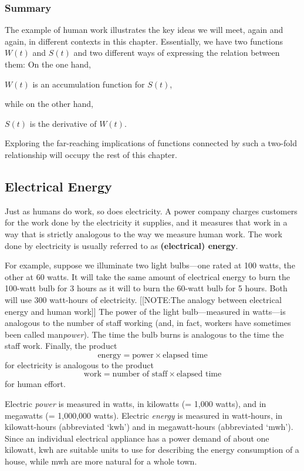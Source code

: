 \subsubsection{Summary}
\label{subsubsec:summary}

The example of human work illustrates the key ideas we will meet,
again and again, in different contexts in this chapter. Essentially,
we have two functions $W(t)$ and $S(t)$ and two different ways of
expressing the relation between them: On the one hand,
\begin{center}
$W(t)$ is an accumulation function for $S(t)$,
\end{center}
while on the other hand,
\begin{center}
$S(t)$ is the derivative of $W(t)$.
\end{center}
Exploring the far-reaching implications of functions connected by such
a two-fold relationship will occupy the rest of this chapter.





\subsection{Electrical Energy}
\label{subsec:electrical-energy}

Just as humans do work, so does electricity.  A power company charges
customers for the work done by the electricity it supplies, and it
measures that work in a way that is strictly analogous to the way we
measure human work.  The work done by electricity is usually referred
to as {\bf (electrical) energy}.

	For example, suppose we illuminate two light bulbs---one  rated at 100 watts, the other at 60 watts.  It will take the same amount of electrical energy to burn the 100-watt bulb for 3 hours as it will to burn the 60-watt bulb for 5 hours.  Both will use 300 watt-hours of electricity.  
	[[NOTE:The analogy between electrical energy and human work]]
The power of the light bulb---measured in watts---is analogous to the number of staff working (and, in fact, workers have sometimes been called man{\em power\/}).  The time the bulb burns is analogous to the time the staff work.  Finally, the product
	\[
\mbox{energy} = \mbox{power} \times 
		\mbox{elapsed time}
\]
for electricity is analogous to the product 
	\[
\mbox{work} = \mbox{number of staff}
		 \times \mbox{elapsed time}
\]
for human effort.  

	Electric {\em power\/} is measured in watts, in kilowatts (= 1{,}000 watts), and in megawatts (= 1{,}000{,}000 watts).  Electric {\em energy\/} is measured in watt-hours, in kilowatt-hours (abbreviated `kwh') and in megawatt-hours (abbreviated `mwh').  Since an individual electrical appliance has a power demand of about one kilowatt, kwh are suitable units to use for describing the energy consumption of a house, while mwh are more natural for a whole town.

